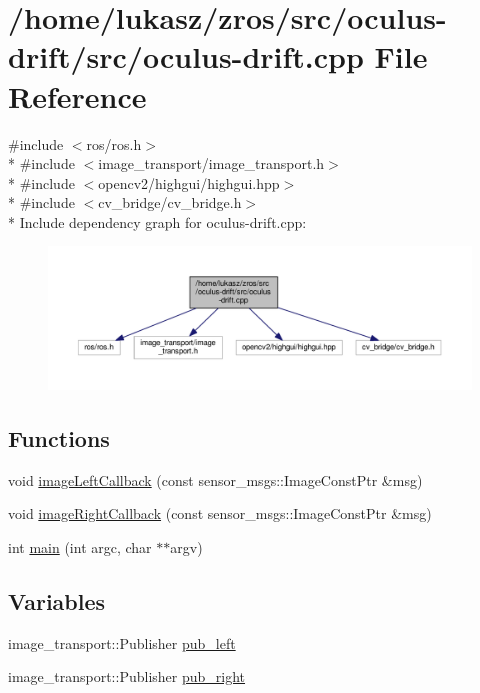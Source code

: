 \hypertarget{oculus-drift_8cpp}{}\section{/home/lukasz/zros/src/oculus-\/drift/src/oculus-\/drift.cpp File Reference}
\label{oculus-drift_8cpp}
{\ttfamily \#include $<$ros/ros.\+h$>$}\\*
{\ttfamily \#include $<$image\+\_\+transport/image\+\_\+transport.\+h$>$}\\*
{\ttfamily \#include $<$opencv2/highgui/highgui.\+hpp$>$}\\*
{\ttfamily \#include $<$cv\+\_\+bridge/cv\+\_\+bridge.\+h$>$}\\*
Include dependency graph for oculus-\/drift.cpp\+:\nopagebreak
\begin{figure}[H]
\begin{center}
\leavevmode
\includegraphics[width=350pt]{oculus-drift_8cpp__incl}
\end{center}
\end{figure}
\subsection*{Functions}
\begin{DoxyCompactItemize}
\item 
void \hyperlink{oculus-drift_8cpp_accfc2045f699b2d8782deca8e1d971cf}{image\+Left\+Callback} (const sensor\+\_\+msgs\+::\+Image\+Const\+Ptr \&msg)
\item 
void \hyperlink{oculus-drift_8cpp_a2bee7d800dfae62103d7aaa2e0961787}{image\+Right\+Callback} (const sensor\+\_\+msgs\+::\+Image\+Const\+Ptr \&msg)
\item 
int \hyperlink{oculus-drift_8cpp_a3c04138a5bfe5d72780bb7e82a18e627}{main} (int argc, char $\ast$$\ast$argv)
\end{DoxyCompactItemize}
\subsection*{Variables}
\begin{DoxyCompactItemize}
\item 
image\+\_\+transport\+::\+Publisher \hyperlink{oculus-drift_8cpp_a1d96cf0c556aa6b5ba7b3b7ad43ca252}{pub\+\_\+left}
\item 
image\+\_\+transport\+::\+Publisher \hyperlink{oculus-drift_8cpp_a69feb6a1df472e1ccf35b35d4f63edd2}{pub\+\_\+right}
\end{DoxyCompactItemize}


